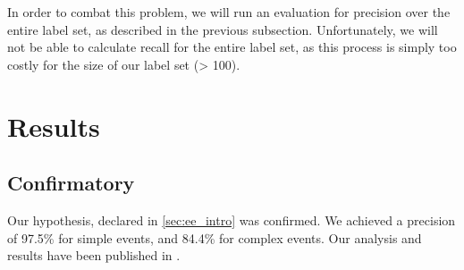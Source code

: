 In order to combat this problem, we will run an evaluation for precision over
the entire label set, as described in the previous subsection. Unfortunately,
we will not be able to calculate recall for the entire label set, as this
process is simply too costly for the size of our label set (> 100).

\section{Results}

\subsection{Confirmatory}
Our hypothesis, declared in \autoref{sec:ee_intro} was confirmed. We achieved a
precision of 97.5\% for simple events, and 84.4\% for complex events. Our
analysis and results have been published in \citet{nitschke-etal-2022-rule}.
